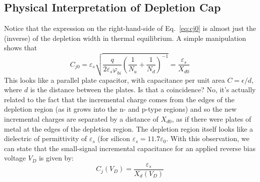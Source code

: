 \subsection{Physical Interpretation of Depletion Cap}
Notice that the expression on the right-hand-side of Eq.~\ref{eq:cj0} is almost just the (inverse) of the depletion width in thermal equilibrium.  A simple manipulation shows that
    \begin{equation} 
        {C_{j0}} = {\varepsilon _s}\sqrt {\frac{q}{{2{\varepsilon _s}{\varphi _{bi}}}}{{\left( {\frac{1}{{{N_a}}} + \frac{1}{{{N_d}}}} \right)}^{ - 1}}}  = \frac{{{\varepsilon _s}}}{{{X_{d0}}}}
    \end{equation}
This looks like a parallel plate capacitor, with capacitance per unit area $C = \epsilon/d$, where $d$ is the distance between the plates. Is that a coincidence?  No, it's actually related to the fact that the incremental charge comes from the edges of the depletion region (as it grows into the n- and p-type regions) and so the new incremental charges are separated by a distance of $X_{d0}$, as if there were plates of metal at the edges of the depletion region.  The depletion region itself looks like a dielectric of permittivity of $\varepsilon_s$ (for silicon $\varepsilon_s = 11.7 \varepsilon_0$.  With this observation, we can state that the small-signal incremental capacitance for an applied reverse bias voltage $V_D$ is given by:
    \begin{equation} 
        C_j^{}({V_D}) = \frac{{{\varepsilon _s}}}{{{X_d}({V_D})}} 
    \end{equation}
